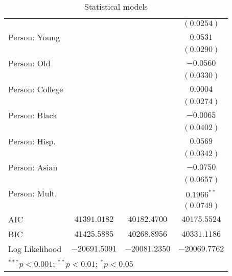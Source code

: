 \begin{table}
\begin{center}
\begin{tabular}{l c c c}
                &                 &                 & $(0.0254)$      \\
Person: Young   &                 &                 & $0.0531$        \\
                &                 &                 & $(0.0290)$      \\
Person: Old     &                 &                 & $-0.0560$       \\
                &                 &                 & $(0.0330)$      \\
Person: College &                 &                 & $0.0004$        \\
                &                 &                 & $(0.0274)$      \\
Person: Black   &                 &                 & $-0.0065$       \\
                &                 &                 & $(0.0402)$      \\
Person: Hisp.   &                 &                 & $0.0569$        \\
                &                 &                 & $(0.0342)$      \\
Person: Asian   &                 &                 & $-0.0750$       \\
                &                 &                 & $(0.0657)$      \\
Person: Mult.   &                 &                 & $0.1966^{**}$   \\
                &                 &                 & $(0.0749)$      \\
\midrule
AIC             & $41391.0182$    & $40182.4700$    & $40175.5524$    \\
BIC             & $41425.5885$    & $40268.8956$    & $40331.1186$    \\
Log Likelihood  & $-20691.5091$   & $-20081.2350$   & $-20069.7762$   \\
\bottomrule
\multicolumn{4}{l}{\scriptsize{$^{***}p<0.001$; $^{**}p<0.01$; $^{*}p<0.05$}}
\end{tabular}
\caption{Statistical models}
\label{table:coefficients}
\end{center}
\end{table}
